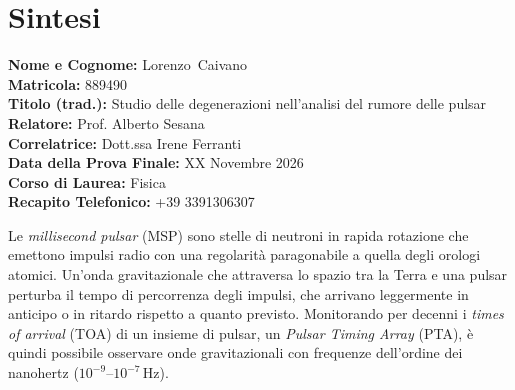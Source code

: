 \documentclass[12pt]{report}
\newcommand{\cognomeIT}{Caivano}
\newcommand{\nomeIT}{Lorenzo}
\newcommand{\matricolaIT}{889490}
\newcommand{\titoloTesiIT}{Studio delle degenerazioni nell'analisi del rumore delle pulsar}
\newcommand{\relatoreIT}{Prof. Alberto Sesana}
\newcommand{\correlatoreIT}{Dott.ssa Irene Ferranti}
\newcommand{\dataSedutaIT}{XX Novembre 2026}
\newcommand{\corsoDiLaureaIT}{Fisica}
\newcommand{\recapitoTelefonicoIT}{+39 3391306307}
\begin{document}
\thispagestyle{empty}

\chapter*{Sintesi}
\begin{center}
\textbf{Nome e Cognome:} \nomeIT \, \cognomeIT \\[0.3cm]
\textbf{Matricola:} \matricolaIT \\[0.3cm]
\textbf{Titolo (trad.):} \titoloTesiIT \\[0.3cm]
\textbf{Relatore:} \relatoreIT \\[0.3cm]
\textbf{Correlatrice:} \correlatoreIT \\[0.3cm]
\textbf{Data della Prova Finale:} \dataSedutaIT \\[0.3cm]
\textbf{Corso di Laurea:} \corsoDiLaureaIT \\[0.3cm]
\textbf{Recapito Telefonico:} \recapitoTelefonicoIT \\
\end{center}

\vspace{1cm}
\sloppy



\noindent
Le \textit{millisecond pulsar} (MSP) sono stelle di neutroni in rapida rotazione che
emettono impulsi radio con una regolarità paragonabile a quella degli orologi
atomici. Un'onda gravitazionale che attraversa lo spazio tra la Terra e una pulsar
perturba il tempo di percorrenza degli impulsi, che arrivano leggermente in
anticipo o in ritardo rispetto a quanto previsto. Monitorando per decenni i
\textit{times of arrival} (TOA) di un insieme di pulsar, un \textit{Pulsar Timing
Array} (PTA), è quindi possibile osservare onde gravitazionali con frequenze
dell'ordine dei nanohertz ($10^{-9}$--$10^{-7}$\,Hz). \par
\end{document}
